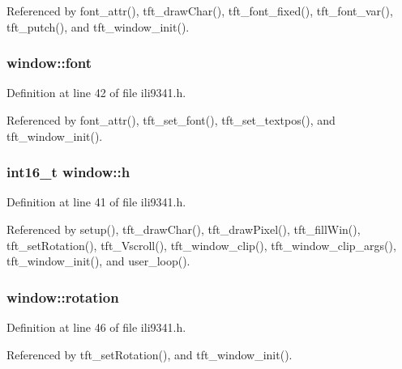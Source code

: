 Referenced by font\+\_\+attr(), tft\+\_\+draw\+Char(), tft\+\_\+font\+\_\+fixed(), tft\+\_\+font\+\_\+var(), tft\+\_\+putch(), and tft\+\_\+window\+\_\+init().

\subsubsection[{\texorpdfstring{font}{font}}]{ window\+::font}\hypertarget{structwindow_acee24e56db43557a46cbb5ca3fe35021}{}\label{structwindow_acee24e56db43557a46cbb5ca3fe35021}


Definition at line 42 of file ili9341.\+h.



Referenced by font\+\_\+attr(), tft\+\_\+set\+\_\+font(), tft\+\_\+set\+\_\+textpos(), and tft\+\_\+window\+\_\+init().

\subsubsection[{\texorpdfstring{h}{h}}]{\setlength{\rightskip}{0pt plus 5cm}int16\+\_\+t window\+::h}\hypertarget{structwindow_a822391abd5d09e6ce7152f68cff3ef2b}{}\label{structwindow_a822391abd5d09e6ce7152f68cff3ef2b}


Definition at line 41 of file ili9341.\+h.



Referenced by setup(), tft\+\_\+draw\+Char(), tft\+\_\+draw\+Pixel(), tft\+\_\+fill\+Win(), tft\+\_\+set\+Rotation(), tft\+\_\+\+Vscroll(), tft\+\_\+window\+\_\+clip(), tft\+\_\+window\+\_\+clip\+\_\+args(), tft\+\_\+window\+\_\+init(), and user\+\_\+loop().

\subsubsection[{\texorpdfstring{rotation}{rotation}}]{ window\+::rotation}\hypertarget{structwindow_afbd48ebcb41e68d0f458dac593578aa8}{}\label{structwindow_afbd48ebcb41e68d0f458dac593578aa8}


Definition at line 46 of file ili9341.\+h.



Referenced by tft\+\_\+set\+Rotation(), and tft\+\_\+window\+\_\+init().

